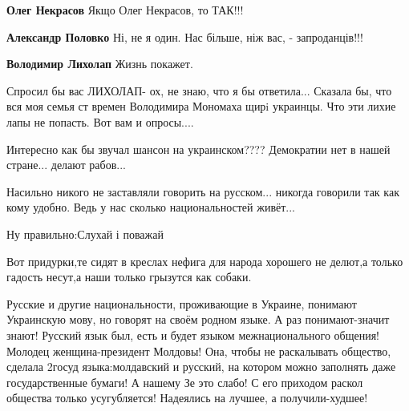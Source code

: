 \begin{itemize}
\textbf{Олег Некрасов} Якщо Олег Некрасов, то ТАК!!!

\textbf{Александр Половко} Ні, не я один. Нас більше, ніж вас, - запроданців!!!

\textbf{Володимир Лихолап} Жизнь покажет.

Спросил бы вас ЛИХОЛАП- ох, не знаю, что я бы ответила... Сказала бы, что вся моя семья ст времен Володимира Мономаха щирi украинцы. Что эти лихие лапы не попасть. Вот вам и опросы....


\end{itemize}


Интересно как бы звучал шансон на украинском???? Демократии нет в нашей
стране... делают рабов...


Насильно никого не заставляли говорить на русском... никогда говорили так как
кому удобно. Ведь у нас сколько национальностей живёт...

Ну правильно:Слухай і поважай

Вот придурки,те сидят в креслах нефига для народа хорошего не делют,а только гадость несут,а наши только грызутся как собаки.


Русские и другие национальности, проживающие в Украине, понимают Украинскую
мову, но говорят на своём родном языке. А раз понимают-значит знают! Русский
язык был, есть и будет языком межнационального общения! Молодец
женщина-президент Молдовы! Она, чтобы не раскалывать общество, сделала 2госуд
языка:молдавский и русский, на котором можно заполнять даже государственные
бумаги! А нашему Зе это слабо! С его приходом раскол общества только
усугубляется! Надеялись на лучшее, а получили-худшее!

